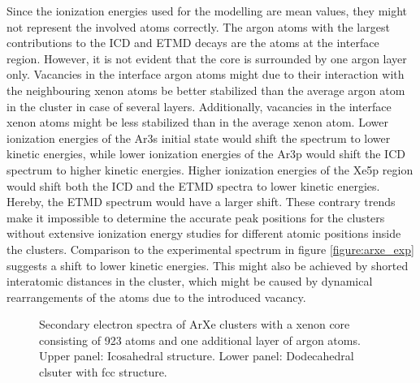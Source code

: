 Since the ionization energies used for the modelling are mean values, they
might not represent the involved atoms correctly. The argon atoms with the
largest contributions to the ICD and ETMD decays are the atoms at the interface
region. However, it is not evident that the core is surrounded by one argon
layer only. Vacancies in the interface argon atoms might due to
their interaction with the
neighbouring xenon atoms be better stabilized than the average argon atom in the
cluster in case of several layers. Additionally, vacancies in the interface
xenon atoms might be less stabilized than in the average xenon atom.
Lower ionization energies of the Ar3s initial state would shift the spectrum
to lower kinetic energies, while lower ionization energies of the Ar3p
would shift the \ac{ICD} spectrum to higher kinetic energies.
Higher ionization energies of the Xe5p region would shift both the ICD and
the ETMD spectra to lower kinetic energies. Hereby, the ETMD spectrum would
have a larger shift. These contrary trends make it impossible to determine the
accurate peak positions for the clusters without extensive ionization energy
studies for different atomic positions inside the clusters.
Comparison to the experimental spectrum in figure \ref{figure:arxe_exp}
suggests a shift to lower kinetic energies.
This might also be achieved by shorted interatomic distances in the cluster,
which might be caused by dynamical rearrangements of the atoms due to
the introduced vacancy.


\begin{figure}[]
 \centering
 
 
 \caption{Secondary electron spectra of ArXe clusters with a xenon core
          consisting of 923 atoms and one additional layer of argon atoms.\\
          Upper panel: Icosahedral structure. Lower panel: Dodecahedral
          clsuter with fcc structure.}
 \label{figure:exp_923_arxe}
\end{figure}


